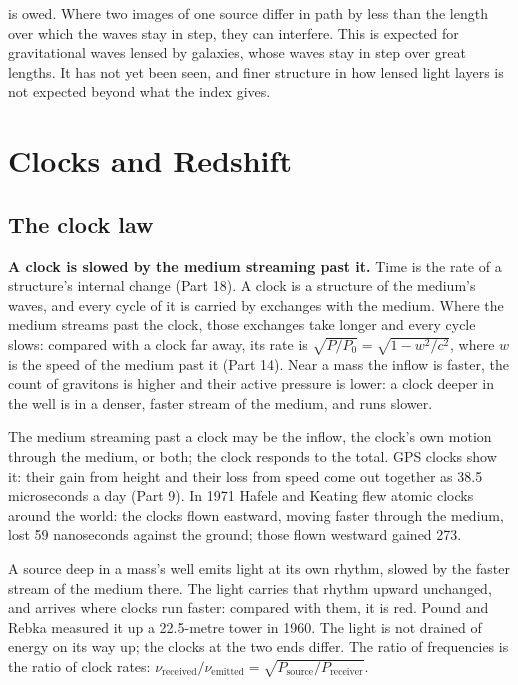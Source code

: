  is owed. Where two images of one source differ in path by less than the length over which the waves stay in step, they can interfere. This is expected for gravitational waves lensed by galaxies, whose waves stay in step over great lengths. It has not yet been seen, and finer structure in how lensed light layers is not expected beyond what the index gives.

\section{Clocks and Redshift}

\subsection{The clock law}

\begin{hypbar}
\textbf{A clock is slowed by the medium streaming past it.} Time is the rate of a structure's internal change (Part 18).\footnotemark{} A clock is a structure of the medium's waves, and every cycle of it is carried by exchanges with the medium. Where the medium streams past the clock, those exchanges take longer and every cycle slows: compared with a clock far away, its rate is $\sqrt{P/P_0} = \sqrt{1 - w^2/c^2}$, where $w$ is the speed of the medium past it (Part 14).\footnotemark{} Near a mass the inflow is faster, the count of gravitons is higher and their active pressure is lower: a clock deeper in the well is in a denser, faster stream of the medium, and runs slower.
\end{hypbar}
\addtocounter{footnote}{-1}

 The medium streaming past a clock may be the inflow, the clock's own motion through the medium, or both; the clock responds to the total. GPS clocks show it: their gain from height and their loss from speed come out together as 38.5 microseconds a day (Part 9). In 1971 Hafele and Keating flew atomic clocks around the world: the clocks flown eastward, moving faster through the medium, lost 59 nanoseconds against the ground; those flown westward gained 273.

 A source deep in a mass's well emits light at its own rhythm, slowed by the faster stream of the medium there. The light carries that rhythm upward unchanged, and arrives where clocks run faster: compared with them, it is red. Pound and Rebka measured it up a 22.5-metre tower in 1960. The light is not drained of energy on its way up; the clocks at the two ends differ. The ratio of frequencies is the ratio of clock rates: $\nu_{\text{received}}/\nu_{\text{emitted}} = \sqrt{P_{\text{source}}/P_{\text{receiver}}}$.

